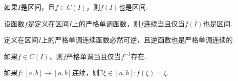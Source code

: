\begin{corollary}
如果\(I\)是区间，且\(f\in C(I)\)，则\(f(I)\)也是区间.
\end{corollary}

\begin{corollary}
设函数\(f\)是定义在区间\(I\)上的严格单调函数，则\(f\)连续当且仅当\(f(I)\)也是区间.
\end{corollary}

\begin{corollary}
定义在区间\(I\)上的严格单调连续函数必然可逆，且逆函数也是严格单调连续的.
\end{corollary}

\begin{corollary}
如果\(f \in C(I)\)，则\(f\)严格单调当且仅当\(f^{-1}\)存在.
\end{corollary}

\begin{corollary}
如果\(f\colon[a,b]\to[a,b]\)连续，则\(\exists\xi\in[a,b]: f(\xi)=\xi\).
\end{corollary}


